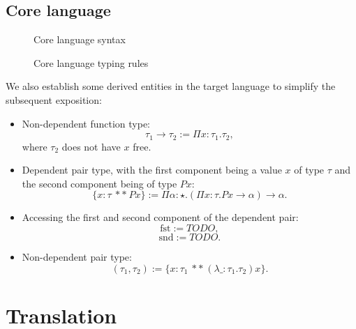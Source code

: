 \documentclass[a4paper]{article}
\begin{document}
\subsection{Core language}

\begin{figure}[ht]
  \footnotesize
  \caption{Core language syntax}
  \label{fig:core_syntax}
\end{figure}

\begin{figure}[ht]
  \footnotesize
  \caption{Core language typing rules}
  \label{fig:surface_typing}
\end{figure}

We also establish some derived entities in the target language to simplify the subsequent exposition:

\begin{itemize}
  \item Non-dependent function type:
	\[
	  \tau_1 \rightarrow \tau_2 := \Pi x : \tau_1. \tau_2,
	\]
	where $\tau_2$ does not have $x$ free.
  \item Dependent pair type, with the first component being a value $x$ of type $\tau$ and the second component being of type $P x$:
	\[
	  \{ x : \tau\ **\ P x \} := \Pi \alpha : \star. (\Pi x : \tau. P x \rightarrow \alpha) \rightarrow \alpha.
	\]
  \item Accessing the first and second component of the dependent pair:
	\[
	  \text{fst} := TODO,
	\]
	\[
	  \text{snd} := TODO.
	\]
  \item Non-dependent pair type:
	\[
	  (\tau_1, \tau_2) := \{ x : \tau_1\ **\ (\lambda \_ : \tau_1. \tau_2) x \}.
	\]
\end{itemize}

\section{Translation}
\end{document}
